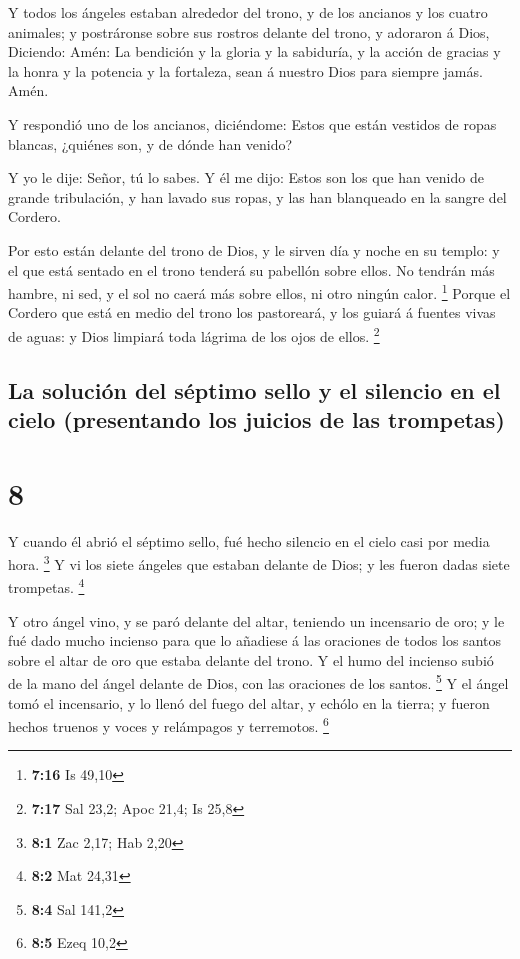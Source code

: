  Y todos los ángeles estaban alrededor del trono, y de
los ancianos y los cuatro animales; y postráronse sobre sus rostros
delante del trono, y adoraron á Dios,  Diciendo: Amén: La
bendición y la gloria y la sabiduría, y la acción de gracias y la honra
y la potencia y la fortaleza, sean á nuestro Dios para siempre jamás.
Amén.

 Y respondió uno de los ancianos, diciéndome: Estos que
están vestidos de ropas blancas, ¿quiénes son, y de dónde han venido?

 Y yo le dije: Señor, tú lo sabes. Y él me dijo: Estos
son los que han venido de grande tribulación, y han lavado sus ropas, y
las han blanqueado en la sangre del Cordero.

 Por esto están delante del trono de Dios, y le sirven
día y noche en su templo: y el que está sentado en el trono tenderá su
pabellón sobre ellos.  No tendrán más hambre, ni sed, y
el sol no caerá más sobre ellos, ni otro ningún calor. \footnote{\textbf{7:16}
  Is 49,10}  Porque el Cordero que está en medio del
trono los pastoreará, y los guiará á fuentes vivas de aguas: y Dios
limpiará toda lágrima de los ojos de ellos. \footnote{\textbf{7:17} Sal
  23,2; Apoc 21,4; Is 25,8}

\hypertarget{la-soluciuxf3n-del-suxe9ptimo-sello-y-el-silencio-en-el-cielo-presentando-los-juicios-de-las-trompetas}{%
\subsection{La solución del séptimo sello y el silencio en el cielo
(presentando los juicios de las
trompetas)}\label{la-soluciuxf3n-del-suxe9ptimo-sello-y-el-silencio-en-el-cielo-presentando-los-juicios-de-las-trompetas}}

\hypertarget{section-7}{%
\section{8}\label{section-7}}

 Y cuando él abrió el séptimo sello, fué hecho silencio en
el cielo casi por media hora. \footnote{\textbf{8:1} Zac 2,17; Hab 2,20}
 Y vi los siete ángeles que estaban delante de Dios; y les
fueron dadas siete trompetas. \footnote{\textbf{8:2} Mat 24,31}

 Y otro ángel vino, y se paró delante del altar, teniendo
un incensario de oro; y le fué dado mucho incienso para que lo añadiese
á las oraciones de todos los santos sobre el altar de oro que estaba
delante del trono.  Y el humo del incienso subió de la
mano del ángel delante de Dios, con las oraciones de los santos.
\footnote{\textbf{8:4} Sal 141,2}  Y el ángel tomó el
incensario, y lo llenó del fuego del altar, y echólo en la tierra; y
fueron hechos truenos y voces y relámpagos y terremotos. \footnote{\textbf{8:5}
  Ezeq 10,2}

